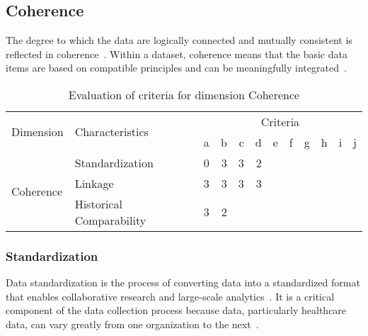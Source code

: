 \newpage
\subsection{Coherence}

The degree to which the data are logically connected and mutually consistent is reflected in coherence~\cite{oecd}.
Within a dataset, coherence means that the basic data items are based on compatible principles and can be meaningfully integrated~\cite{oecd}.

\begin{table}[htbp]
    \centering

    \begin{tabular}{llrrrrrrrrrr}
        \toprule
        \multirow{2}{*}{Dimension}  & \multirow{2}{*}{Characteristics}  & \multicolumn{10}{c}{Criteria}         \\ \cmidrule(lr){3-12}
                                    &                                   & a & b & c & d & e & f & g & h & i & j \\ \midrule
        \multirow{3}{*}{Coherence}  & Standardization                   & 0 & 3 & 3 & 2 &   &   &   &   &   &   \\
                                    & Linkage                           & 3 & 3 & 3 & 3 &   &   &   &   &   &   \\
                                    & Historical Comparability          & 3 & 2 &   &   &   &   &   &   &   &   \\
        \bottomrule
    \end{tabular}

    \caption{Evaluation of criteria for dimension Coherence}
    \label{table:coherence-benchmark}
\end{table}
\FloatBarrier

\subsubsection{Standardization}

Data standardization is the process of converting data into a standardized format that enables collaborative research and large-scale analytics~\cite{ohdsi-standardization}.
It is a critical component of the data collection process because data, particularly healthcare data, can vary greatly from one organization to the next~\cite{ohdsi-standardization}.

